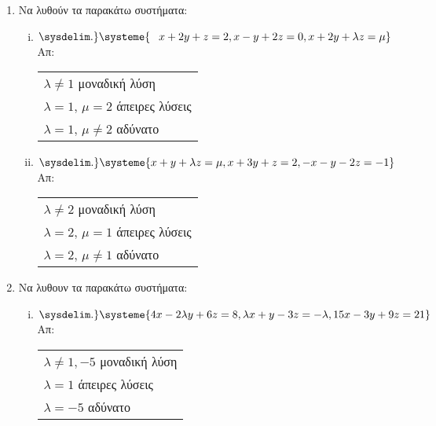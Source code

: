 


\usepackage{systeme}

\setlength{\itemsep}{\baselineskip}


\begin{center}
\end{center}

\vspace{\baselineskip}

  \begin{enumerate}
    \setlength{\itemsep}{\baselineskip}
    \item Να λυθούν τα παρακάτω συστήματα:

       \begin{enumerate}[i)]
         \setlength{\itemsep}{\baselineskip}
         \item $\sysdelim.\} \systeme{\phantom{-}x+2y+z=2, x-y+2z=0, x+2y+\lambda z= \mu}$ \hfill Απ: \begin{tabular}{l}
           $\lambda\neq 1$ μοναδική λύση \\
           $\lambda=1$, $\mu=2$ άπειρες λύσεις \\
           $\lambda=1$, $\mu\neq 2$ αδύνατο
         \end{tabular}
         \item $\sysdelim.\} \systeme{x+y+\lambda z = \mu, x+3y+z = 2, -x-y-2z = -1}$ \hfill Απ: \begin{tabular}{l}
           $\lambda\neq 2$ μοναδική λύση \\
           $\lambda=2$, $\mu=1$ άπειρες λύσεις \\
           $\lambda=2$, $\mu\neq 1$ αδύνατο
       \end{tabular}
       \end{enumerate}
    \item Να λυθουν τα παρακάτω συστήματα:

    \begin{enumerate}[i)]
      \item $\sysdelim.\} \systeme{4x-2\lambda y + 6z = 8, \lambda x + y -3z = -\lambda, 15x -3y + 9z = 21}$ \hfill Απ: \begin{tabular}{l}
      $\lambda \neq 1,-5$ μοναδική λύση \\
      $\lambda = 1$ άπειρες λύσεις \\
      $\lambda =-5$ αδύνατο
    \end{tabular}

    \end{enumerate}

  \end{enumerate}


